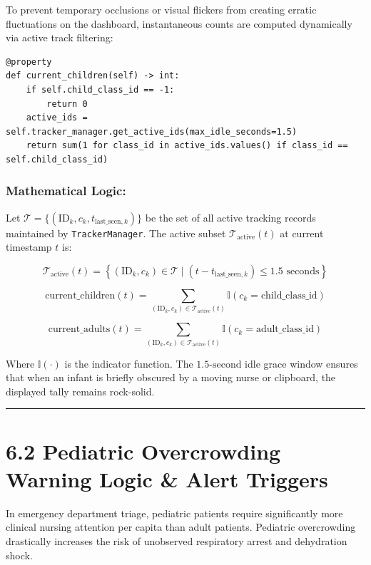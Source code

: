 To prevent temporary occlusions or visual flickers from creating erratic
fluctuations on the dashboard, instantaneous counts are computed
dynamically via active track filtering:

\begin{verbatim}
@property
def current_children(self) -> int:
    if self.child_class_id == -1:
        return 0
    active_ids = self.tracker_manager.get_active_ids(max_idle_seconds=1.5)
    return sum(1 for class_id in active_ids.values() if class_id == self.child_class_id)
\end{verbatim}

\subsubsection{Mathematical Logic:}\label{mathematical-logic}

Let \(\mathcal{T} = \{ (\text{ID}_k, c_k, t_{\text{last\_seen}, k}) \}\)
be the set of all active tracking records maintained by
\texttt{TrackerManager}. The active subset
\(\mathcal{T}_{\text{active}}(t)\) at current timestamp \(t\) is:

\[\mathcal{T}_{\text{active}}(t) = \left\{ (\text{ID}_k, c_k) \in \mathcal{T} \mid (t - t_{\text{last\_seen}, k}) \le 1.5\text{ seconds} \right\}\]

\[\text{current\_children}(t) = \sum_{(\text{ID}_k, c_k) \in \mathcal{T}_{\text{active}}(t)} \mathbb{I}(c_k = \text{child\_class\_id})\]

\[\text{current\_adults}(t) = \sum_{(\text{ID}_k, c_k) \in \mathcal{T}_{\text{active}}(t)} \mathbb{I}(c_k = \text{adult\_class\_id})\]

Where \(\mathbb{I}(\cdot)\) is the indicator function. The
\(1.5\text{-second}\) idle grace window ensures that when an infant is
briefly obscured by a moving nurse or clipboard, the displayed tally
remains rock-solid.

\begin{center}\rule{0.5\linewidth}{0.5pt}\end{center}

\section{6.2 Pediatric Overcrowding Warning Logic \& Alert
Triggers}\label{pediatric-overcrowding-warning-logic-alert-triggers}

In emergency department triage, pediatric patients require significantly
more clinical nursing attention per capita than adult patients.
Pediatric overcrowding drastically increases the risk of unobserved
respiratory arrest and dehydration shock.


